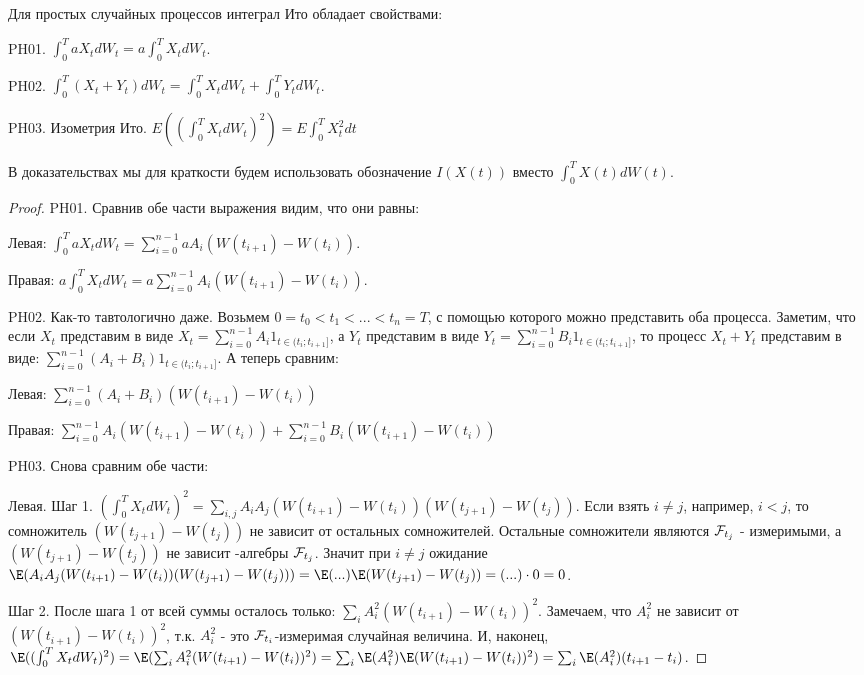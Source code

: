 {\begin{myth} Для простых случайных процессов интеграл Ито обладает свойствами:

PH01. $\int_{0}^{T}aX_{t}dW_{t}=a\int_{0}^{T}X_{t}dW_{t}$.

PH02. $\int_{0}^{T}(X_{t}+Y_{t})dW_{t}=\int_{0}^{T}X_{t}dW_{t}+\int_{0}^{T}Y_{t}dW_{t}$.

PH03. Изометрия Ито. $E\left((\int_{0}^{T}X_{t}dW_{t})^{2}\right)=E\int_{0}^{T}X_{t}^{2}dt$
\end{myth}
В доказательствах мы для краткости будем использовать обозначение $I(X(t))$ вместо $\int_{0}^{T}X(t)dW(t)$.

\begin{proof}
PH01. Сравнив обе части выражения видим, что они равны:

Левая: $\int_{0}^{T}aX_{t}dW_{t}=\sum_{i=0}^{n-1}aA_{i}(W(t_{i+1})-W(t_{i}))$.

Правая: $a\int_{0}^{T}X_{t}dW_{t}=a\sum_{i=0}^{n-1}A_{i}(W(t_{i+1})-W(t_{i}))$.

PH02. Как-то тавтологично даже. Возьмем  $0=t_{0}<t_{1}<...<t_{n}=T$, с помощью которого можно представить оба процесса. Заметим, что если $X_{t}$ представим в виде $X_{t}=\sum_{i=0}^{n-1}A_{i}1_{t\in(t_{i};t_{i+1}]}$, а $Y_{t}$ представим в виде $Y_{t}=\sum_{i=0}^{n-1}B_{i}1_{t\in(t_{i};t_{i+1}]}$, то процесс $X_{t}+Y_{t}$ представим в виде: $\sum_{i=0}^{n-1}(A_{i}+B_{i})1_{t\in(t_{i};t_{i+1}]}$. А теперь сравним:

Левая: $\sum_{i=0}^{n-1}(A_{i}+B_{i})(W(t_{i+1})-W(t_{i}))$

Правая: $\sum_{i=0}^{n-1}A_{i}(W(t_{i+1})-W(t_{i}))+\sum_{i=0}^{n-1}B_{i}(W(t_{i+1})-W(t_{i}))$

PH03. Снова сравним обе части:

Левая. Шаг 1. $(\int_{0}^{T}X_{t}dW_{t})^{2}=\sum_{i,j}A_{i}A_{j}(W(t_{i+1})-W(t_{i}))(W(t_{j+1})-W(t_{j}))$. Если взять $i\neq j$, например, $i<j$, то сомножитель $(W(t_{j+1})-W(t_{j}))$ не зависит от остальных сомножителей. Остальные сомножители являются $\mathcal{F}_{t_{j}}$ - измеримыми, а $(W(t_{j+1})-W(t_{j}))$ не зависит \s-алгебры $\mathcal{F}_{t_{j}}$. Значит при $i\neq j$ ожидание $\E(A_{i}A_{j}(W(t_{i+1})-W(t_{i}))(W(t_{j+1})-W(t_{j})))=\E(...)\E(W(t_{j+1})-W(t_{j}))=(...)\cdot 0=0$.

Шаг 2. После шага 1 от всей суммы осталось только: $\sum_{i}A_{i}^{2}(W(t_{i+1})-W(t_{i}))^{2}$. Замечаем, что $A_{i}^{2}$ не зависит от $(W(t_{i+1})-W(t_{i}))^{2}$, т.к. $A_{i}^{2}$ - это $\mathcal{F}_{t_{i}}$-измеримая случайная величина. И, наконец, $\E((\int_{0}^{T}X_{t}dW_{t})^{2})=\E(\sum_{i}A_{i}^{2}(W(t_{i+1})-W(t_{i}))^{2})=\sum_{i}\E(A_{i}^{2})\E(W(t_{i+1})-W(t_{i}))^{2})=\sum_{i}\E(A_{i}^{2})(t_{i+1}-t_{i})$.


\end{proof}}
